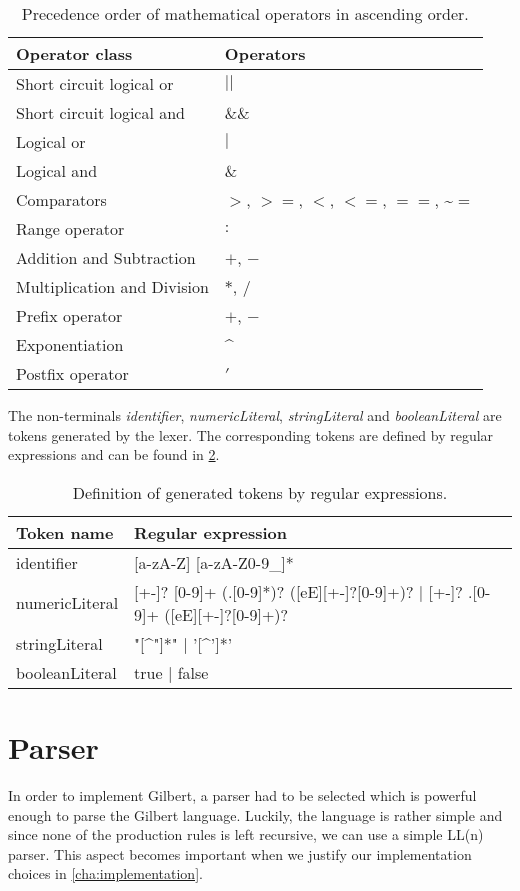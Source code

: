 \begin{table}[!h]
	\centering
	\begin{tabular}{l|l}
	Operator class & Operators\\
	\hline
	Short circuit logical or & $||$\\
	Short circuit logical and & $\&\&$\\
	Logical or & $|$ \\
	Logical and & $\&$ \\
	Comparators & $>$, $>=$, $<$, $<=$, $==$, \textasciitilde$=$\\
	Range operator & $:$ \\
	Addition and Subtraction & $+$, $-$\\
	Multiplication and Division & $*$, $/$\\
	Prefix operator & $+$, $-$\\
	Exponentiation & \textasciicircum\\
	Postfix operator & $'$
	\end{tabular}
	\caption{Precedence order of mathematical operators in ascending order.}
	\label{tab:precedences}
\end{table}

The non-terminals \emph{identifier}, \emph{numericLiteral}, \emph{stringLiteral} and \emph{booleanLiteral} are tokens generated by the lexer. The corresponding tokens are defined by regular expressions and can be found in \cref{tab:tokens}.

\begin{table}[!h]
	\centering
	\begin{tabular}{l|l}
	Token name & Regular expression\\
	\hline
	identifier & [a-zA-Z] [a-zA-Z0-9\_]*\\
	numericLiteral & [+-]? [0-9]+ (.[0-9]*)? ([eE][+-]?[0-9]+)? | [+-]? .[0-9]+ ([eE][+-]?[0-9]+)? \\
	stringLiteral & "[\textasciicircum"]*" | '[\textasciicircum']*'\\
	booleanLiteral & true | false
	\end{tabular}
	\caption{Definition of generated tokens by regular expressions.}
	\label{tab:tokens}
\end{table}

\section{Parser}

In order to implement Gilbert, a parser had to be selected which is powerful enough to parse the Gilbert language.
Luckily, the language is rather simple and since none of the production rules is left recursive, we can use a simple LL(n) parser.
This aspect becomes important when we justify our implementation choices in \cref{cha:implementation}.

